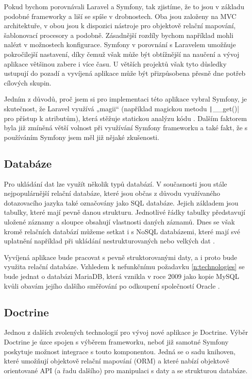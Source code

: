 Pokud bychom porovnávali Laravel a Symfony, tak zjistíme, že to jsou v základu podobné frameworky a liší se spíše v drobnostech. Oba jsou založeny na MVC architektuře, v obou jsou k dispozici nástroje pro objektově relační mapování, šablonovací procesory a podobně. Zásadnější rozdíly bychom například mohli nalézt v možnostech konfigurace. Symfony v porovnání s Laravelem umožňuje pokročilejší nastavení, díky čemuž však může být obtížnější na naučení a vývoj aplikace většinou zabere i více času. U větších projektů však tyto důsledky ustupují do pozadí a vyvíjená aplikace může být přizpůsobena přesně dne potřeb cílových skupin. \cite{symfony_laravel_comparison}

Jedním z důvodů, proč jsem si pro implementaci této aplikace vybral Symfony, je skutečnost, že Laravel využívá „magii“ (například magickou metodu \texttt|__get()| pro přístup k atributům), která stěžuje statickou analýzu kódu \cite{larastan}. Dalším faktorem byla již zmíněná větší volnost při využívání Symfony frameworku a také fakt, že s používáním Symfony jsem měl již nějaké zkušenosti.

\subsection{Databáze}
Pro ukládání dat lze využít několik typů databází. V současnosti jsou stále nejpopulárnější relační databáze, které jsou občas z důvodu využívaného dotazovacího jazyka také označovány jako SQL databáze. Jejich základem jsou tabulky, které mají pevně danou strukturu. Jednotlivé řádky tabulky  představují uložené záznamy a sloupce obsahují vlastnosti daných záznamů. \cite{databases} Dnes se však kromě relačních databází můžeme setkat i s NoSQL databázemi, které mají své uplatnění například při ukládání nestrukturovaných nebo velkých dat \cite{nosql}.

Vyvíjená aplikace bude pracovat s pevně struktorovanými daty, a i proto bude využita relační databáze. Vzhledem k nefunkčnímu požadavku \ref{n:technologies} se bude jednat o databázi MariaDB, která vznikla v roce 2009 jako kopie MySQL kvůli obavám jejího dalšího směřování po odkoupení společností Oracle \cite{mariadb}.

\subsection{Doctrine}
Jednou z dalších zvolených technologií pro vývoj nové aplikace je Doctrine. Výběr Doctrine je úzce spojen s výběrem frameworku, neboť již samotné Symfony poskytuje možnost integrace s touto komponentou. Jedná se o sadu knihoven, které umožňují objektově relační mapování (ORM) a které nabízí objektově orientované API (a řadu dalšího) pro manipulaci s daty a se strukturou databáze. \cite{doctrine_orm, doctrine_dbal}


